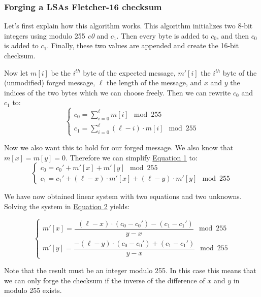 \documentclass[11pt,a4paper,oneside]{article}
\newcommand{\lsubsubsection}[2]{\subsubsection{#1}\label{sec:#2}}
\begin{document}
    \lsubsubsection{Forging a LSAs Fletcher-16 checksum}{flet-algo}
    Let's first explain how this algorithm works.
    This algorithm initializes two 8-bit integers using modulo 255 \textit{c0} and $c_1$.
    Then every byte is added to $c_0$, and then $c_0$ is added to $c_1$.
    Finally, these two values are appended and create the 16-bit checksum.

    Now let $m[i]$ be the $i^{th}$ byte of the expected message, $m'[i]$ the $i^{th}$ byte of the (unmodified) forged message, $\ell$ the length of the message, and $x$ and $y$ the indices of the two bytes which we can choose freely.
    Then we can rewrite $c_0$ and $c_1$ to:
    \begin{equation}
        \label{eq:1}
        \begin{cases}
            c_0 = \sum\limits_{i=0}^{\ell} m[i] \mod{255}\\
            c_1 = \sum\limits_{i=0}^{\ell} (\ell - i) \cdot m[i] \mod{255}
        \end{cases}
    \end{equation}

    Now we also want this to hold for our forged message.
    We also know that $m[x] = m[y] = 0$.
    Therefore we can simplify \hyperref[eq:1]{Equation 1} to:
    \begin{equation}
        \label{eq:2}
        \begin{cases}
            c_0 = c_0' + m'[x] + m'[y] \mod{255}\\
            c_1 = c_1' + (\ell - x) \cdot m'[x] + (\ell - y) \cdot m'[y] \mod{255}
        \end{cases}
    \end{equation}

    We have now obtained linear system with two equations and two unknowns.
    Solving the system in \hyperref[eq:2]{Equation 2} yields:

    \begin{equation}
        \label{eq:3}
        \begin{cases}
            m'[x] = \dfrac{\ \ (\ell - x) \cdot (c_0 - c_0') - (c_1 - c_1')}{y - x} \mod{255}\\
            m'[y] = \dfrac{-(\ell - y) \cdot (c_0 - c_0') + (c_1 - c_1')}{y - x} \mod{255}
        \end{cases}
    \end{equation}

    Note that the result must be an integer modulo 255.
    In this case this means that we can only forge the checksum if the inverse of the difference of $x$ and $y$ in modulo 255 exists.
\end{document}
